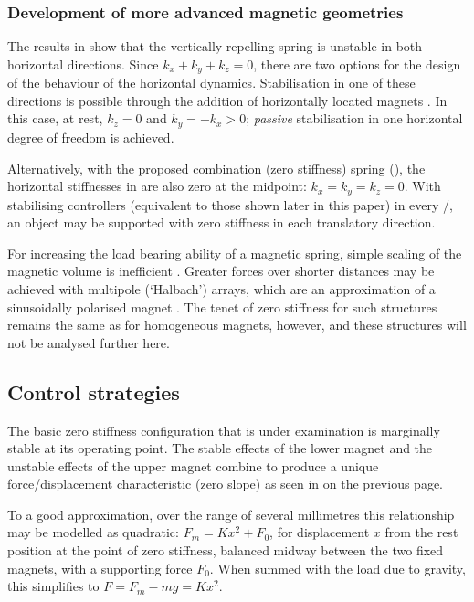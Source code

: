 \subsubsection{Development of more advanced magnetic geometries}


The results in  show that the vertically repelling
spring is unstable in both horizontal directions. Since
$k_x+k_y+k_z=0$, there are two options for the design of the
behaviour of the horizontal dynamics. Stabilisation in one of these
directions is possible through the addition of horizontally located
magnets \cite{robertson2005}. In this case, at rest, $k_z=0$ and
$k_y=-k_x>0$; \emph{passive} stabilisation in one horizontal degree
of freedom is achieved.

Alternatively, with the proposed combination (zero stiffness) spring
(), the horizontal stiffnesses in
 are also zero at the midpoint: $k_x=k_y=k_z=0$.
With stabilising controllers (equivalent to those shown later in
this paper) in every \dof/, an object may be supported
with zero stiffness in each translatory direction.

For increasing the load bearing ability of a magnetic spring, simple
scaling of the magnetic volume is inefficient \cite{yonnet1991}.
Greater forces over shorter distances may be achieved with multipole
(`Halbach') arrays, which are an approximation of a sinusoidally
polarised magnet \cite{robertson2005}. The tenet of zero stiffness
for such structures remains the same as for homogeneous magnets,
however, and these structures will not be analysed further here.

\subsection{Control strategies}

The basic zero stiffness configuration that is under examination is
marginally stable at its operating point. The stable effects of the
lower magnet and the unstable effects of the upper magnet combine to
produce a unique force/displacement characteristic (zero slope) as
seen in  on the previous page.

To a good approximation, over the range of several millimetres this
relationship may be modelled as quadratic: $F_m = K x^2 + F_0$, for
displacement $x$ from the rest position at the point of zero
stiffness, balanced midway between the two fixed magnets, with a
supporting force $F_0$. When summed with the load due to gravity,
this simplifies to $F = F_m - mg = K x^2$.

